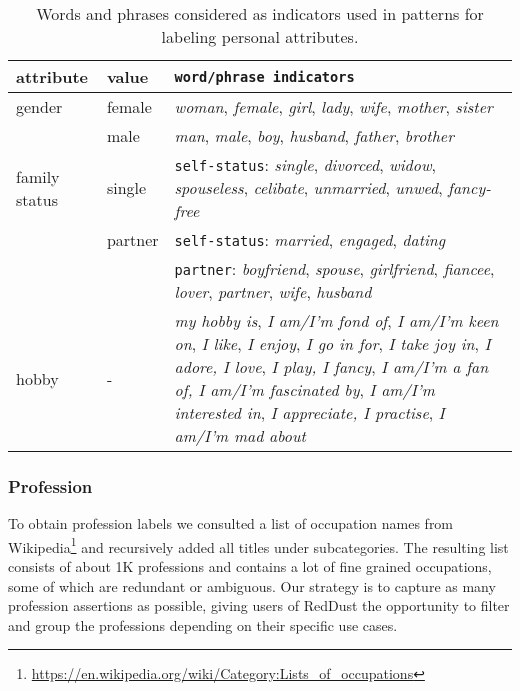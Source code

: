 \begin{table*}
\centering
\begin{adjustbox}{width=0.88\textwidth}
\begin{tabularx}{\linewidth}{llX}
\toprule
\textbf{attribute} & \textbf{value} & \texttt{\footnotesize word/phrase indicators} \\
\midrule
gender & female & \textit{woman}, \textit{female}, \textit{girl}, \textit{lady}, \textit{wife}, \textit{mother}, \textit{sister} \\
 & male & \textit{man}, \textit{male}, \textit{boy}, \textit{husband}, \textit{father}, \textit{brother}
 \\ [1.0ex]
family status & single & \texttt{\footnotesize self-status}: \textit{single}, \textit{divorced}, \textit{widow}, \textit{spouseless}, \textit{celibate}, \textit{unmarried},  \textit{unwed},  \textit{fancy-free} \\
 & partner & \texttt{\footnotesize self-status}: \textit{married}, \textit{engaged}, \textit{dating} \\
 & & \texttt{\footnotesize partner}: \textit{boyfriend}, \textit{spouse}, \textit{girlfriend}, \textit{fiancee}, \textit{lover}, \textit{partner}, \textit{wife}, \textit{husband}
  \\ [1.0ex]
hobby & - & \textit{my hobby is}, \textit{I am/I'm fond of}, \textit{I am/I'm keen on}, \textit{I like}, \textit{I enjoy}, \textit{I go in for}, \textit{I take joy in}, \textit{I adore,} \textit{I love}, \textit{I play, I fancy}, \textit{I am/I'm a fan of, I am/I'm fascinated by}, \textit{I am/I'm interested in}, \textit{I appreciate, I practise}, \textit{I am/I'm mad about} \\
\bottomrule
\end{tabularx}
\end{adjustbox}
\caption{Words and phrases considered as indicators used in patterns for labeling personal attributes.}
\label{word_table}
\end{table*}

\subsubsection{Profession}
To obtain profession labels we consulted a list of occupation names from Wikipedia\footnote{ \href{https://en.wikipedia.org/wiki/Category:Lists\_of\_occupations}{https://en.wikipedia.org/wiki/Category:Lists\_of\_occupations}} and recursively added all titles under subcategories. The resulting list consists of about 1K professions and contains a lot of fine grained occupations, some of which are redundant or ambiguous. Our strategy is to capture as many profession assertions as possible, giving users of RedDust the opportunity to filter and group the professions depending on their specific use cases.

